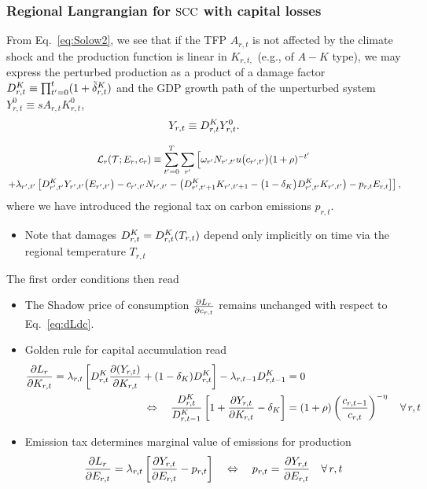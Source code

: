 \documentclass[preprint,3p,authoryear]{elsarticle}
\begin{document}
 \subsubsection{Regional Langrangian for $\operatorname{SCC}$ with capital losses}
\label{sec:LKAreg}
From Eq.~\eqref{eq:Solow2}, we see that if the TFP $A_{r,t}$ is not affected by the climate shock and the production function is linear in $K_{r,t,}$ (e.g., of $A-K$ type), we may express the perturbed production as a product of a damage factor $D^K_{r,t}\equiv\prod_{t'=0}^{t}(1+\tilde{\delta}^K_{r,t})$ and the GDP growth path of the unperturbed system $Y^{0}_{r,t}\equiv s A_{r,t}K_{r,t}^0$,
\begin{equation}
  \label{eq:GDP2}
  Y_{r,t}\equiv D^K_{r,t}Y^{0}_{r,t}.
\end{equation}

\begin{multline}
  \label{eq:LKAreg} \mathcal{L}_r(\mathcal{T};E_r,c_r)\equiv\sum_{t'=0}^{T}\sum_{r'}\left[\omega_{r'}N_{r',t'}u\big(c_{r',t'}\big)(1+\rho)^{-t'}\right.\\
  \left.+\lambda_{r',t'}\left[D^K_{r',t'}Y_{r',t'}\big(E_{r',t'}\big) -c_{r',t'}N_{r',t'}-\left(D^K_{r',t'+1}K_{r',t'+1}-\big(1-\delta_K\big)D^K_{r',t'}K_{r',t'}\right)-p_{r,t}E_{r,t} \right]\right],
\end{multline}
where we have introduced the regional tax on carbon emissions $p_{r,t}$.
\begin{itemize}
\item Note that damages $D^K_{r,t}=D^K_{r,t}(T_{r,t})$ depend only implicitly on time via the regional temperature $T_{r,t}$
\end{itemize}
The first order conditions then read
\begin{itemize}
\item The Shadow price of consumption $\frac{\partial L_r}{\partial c_{r,t}}$ remains unchanged with respect to Eq.~\eqref{eq:dLdc}.

\item Golden rule for capital accumulation read
  \begin{align} \frac{\partial L_r}{\partial K_{r,t}}=\lambda_{r,t}\left[D^K_{r,t}\frac{\partial(Y_{r,t})}{\partial K_{r,t}}+(1-\delta_K)D^K_{r,t}\right]-\lambda_{r,t-1}D^K_{r,t-1}&= 0\notag\\
    \Leftrightarrow\quad \frac{D^K_{r,t}}{D^K_{r,t-1}}\left[1+\frac{\partial Y_{r,t}}{\partial K_{r,t}}-\delta_K\right] &= (1+\rho)\left(\frac{c_{r,t-1}}{c_{r,t}}\right)^{-\eta}\quad\forall\, r,t \label{eq:dLdK}
  \end{align}
\item Emission tax determines marginal value of emissions for production  
  \begin{equation}
    \label{eq:dLdE} \frac{\partial L_r}{\partial E_{r,t}}=\lambda_{r,t}\left[\frac{\partial Y_{r,t}}{\partial E_{r,t}}-p_{r,t}\right]\quad\Leftrightarrow\quad p_{r,t}=\frac{\partial Y_{r,t}}{\partial E_{r,t}} \quad\forall\,r,t 
  \end{equation}
\end{itemize}
\end{document}

